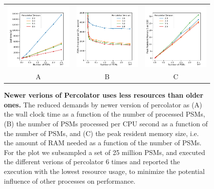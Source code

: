 \documentclass{article}
\begin{document}
\begin{figure}
  \begin{center}
    \begin{tabular}{ccc}
    \includegraphics[width=0.3\linewidth]{img/wall.png} &
    \includegraphics[width=0.3\linewidth]{img/rate.png} &
    \includegraphics[width=0.3\linewidth]{img/memory.png} \\
    A & B & C \\
    \end{tabular}
    \caption{\textbf{Newer verions of Percolator uses less resources than older ones.} 
      The reduced demands by newer version of percolator as (A) the wall clock time as a function of the number of processed PSMs,
      (B) the number of PSMs processed per CPU second as a function of the number of PSMs, and
      (C) the peak resident memory size, i.e. the amount of RAM needed as a function of the number of PSMs. 
      For the plot we subsampled a set of 25 million PSMs, and executed the different verions of percolator 6 times and reported the execution with the lowest resource usage, to minimize the potential influence of other processes on performance.}
    \label{fig:performance}
  \end{center}
\end{figure}
\end{document}
